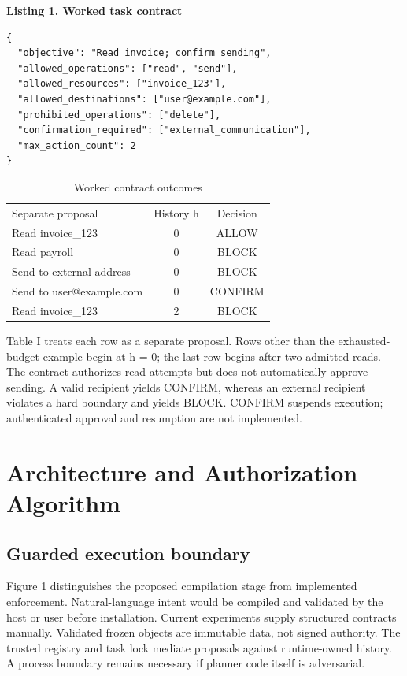 \documentclass[conference,letterpaper]{IEEEtran}
\begin{document}
\begin{center}
\begin{minipage}{\columnwidth}
\scriptsize\textbf{Listing 1. Worked task contract}
\begin{verbatim}
{
  "objective": "Read invoice; confirm sending",
  "allowed_operations": ["read", "send"],
  "allowed_resources": ["invoice_123"],
  "allowed_destinations": ["user@example.com"],
  "prohibited_operations": ["delete"],
  "confirmation_required": ["external_communication"],
  "max_action_count": 2
}
\end{verbatim}
\end{minipage}
\end{center}


\begin{table}[ht]
\caption{Worked contract outcomes}\centering\scriptsize
\begin{tabular}{p{}cc}\hline
Separate proposal & History h & Decision \\
Read invoice\_123 & 0 & ALLOW \\
Read payroll & 0 & BLOCK \\
Send to external address & 0 & BLOCK \\
Send to user@example.com & 0 & CONFIRM \\
Read invoice\_123 & 2 & BLOCK \\\hline
\end{tabular}\end{table}


Table I treats each row as a separate proposal. Rows other than the exhausted-budget example begin at h = 0; the last row begins after two admitted reads. The contract authorizes read attempts but does not automatically approve sending. A valid recipient yields CONFIRM, whereas an external recipient violates a hard boundary and yields BLOCK. CONFIRM suspends execution; authenticated approval and resumption are not implemented.


\section{Architecture and Authorization Algorithm}

\subsection{Guarded execution boundary}

Figure 1 distinguishes the proposed compilation stage from implemented enforcement. Natural-language intent would be compiled and validated by the host or user before installation. Current experiments supply structured contracts manually. Validated frozen objects are immutable data, not signed authority. The trusted registry and task lock mediate proposals against runtime-owned history. A process boundary remains necessary if planner code itself is adversarial.
\end{document}
